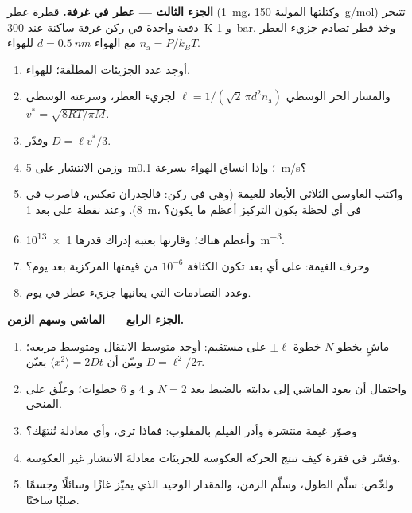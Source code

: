 \begin{problem}
\textbf{الجزء الثالث --- عطر في غرفة.}
قطرة عطر (\qty{1}{mg}، وكتلتها المولية \qty{150}{g/mol}) تتبخر
دفعة واحدة في ركن غرفة ساكنة عند \qty{300}{K} و \qty{1}{bar}.
وخذ قطر تصادم جزيء العطر مع الهواء $d =
\qty{0.5}{nm}$  للهواء $n_{\text{a}} = P/k_BT$.
\begin{enumerate}[resume]
  \item أوجد عدد الجزيئات المطلَقة؛  للهواء.
  \item والمسار الحر الوسطي $\ell = 1/(\sqrt2\,\pi d^2 n_{\text{a}})$ لجزيء
        العطر، وسرعته الوسطى $v^* = \sqrt{8RT/\pi M}$.
  \item وقدّر $D = \ell v^*/3$.
  \item وزمن الانتشار على \qty{5}{m}؛ وإذا انساق الهواء بسرعة
        \qty{0.1}{m/s}؟
  \item واكتب الغاوسي الثلاثي الأبعاد للغيمة (وهي في ركن:
        فالجدران تعكس، فاضرب في $8$). وعند نقطة على بعد \qty{1}{m}،
        في أي لحظة يكون التركيز أعظم ما يكون؟
  \item وأعظم  هناك؛ وقارنها بعتبة إدراك
        قدرها \qty{1e13}{m^{-3}}.
  \item وحرف الغيمة: على أي بعد تكون الكثافة $10^{-6}$ من
        قيمتها المركزية بعد يوم؟
  \item وعدد التصادمات التي يعانيها جزيء عطر في يوم.
\end{enumerate}

\textbf{الجزء الرابع --- الماشي وسهم الزمن.}
\begin{enumerate}[resume]
  \item ماشٍ يخطو $N$ خطوة $\pm\ell$ على مستقيم: أوجد متوسط الانتقال
        ومتوسط مربعه؛ وبيّن أن $\langle x^2\rangle = 2Dt$
        يعيّن $D = \ell^2/2\tau$.
  \item واحتمال أن يعود الماشي إلى بدايته بالضبط بعد
        $N = 2$ و $4$ و $6$ خطوات؛ وعلّق على المنحى.
  \item وصوّر غيمة منتشرة وأدر الفيلم بالمقلوب: فماذا ترى،
        وأي معادلة تُنتهَك؟
  \item وفسّر في فقرة كيف تنتج الحركة العكوسة للجزيئات
        معادلةَ الانتشار غير العكوسة.
  \item ولخّص: سلّم الطول، وسلّم الزمن، والمقدار الوحيد
        الذي يميّز غازًا وسائلًا وجسمًا صلبًا ساخنًا.
\end{enumerate}
\end{problem}
